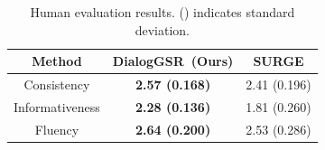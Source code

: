 

\begin{table}[t]
    \small
    \centering
    {
    
    \begin{tabular}{c|cc}
        \toprule
          \textbf{Method} & \textbf{DialogGSR~(Ours)} & SURGE\\
         \midrule 
         \midrule
                       
        Consistency&\textbf{2.57 (0.168)} &2.41 (0.196)        \\
        Informativeness&\textbf{2.28 (0.136)} & 1.81 (0.260) \\
        Fluency &\textbf{2.64 (0.200)} & 2.53 (0.286)  \\
        \bottomrule
    \end{tabular}
    }
    \caption{Human evaluation results. () indicates standard deviation.}
    \label{tab:humaneval}
\end{table}